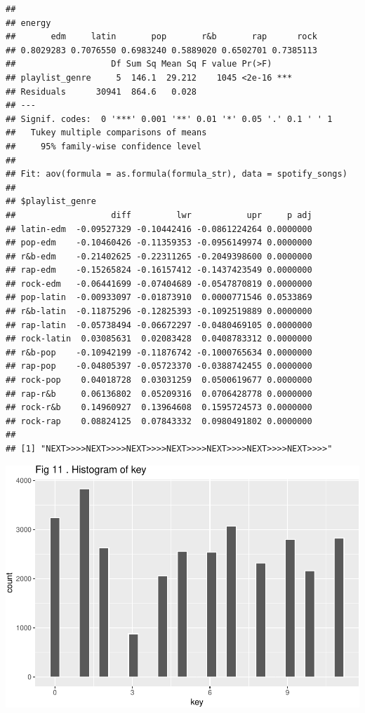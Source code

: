 \documentclass[
]{article}
\begin{document}
\begin{verbatim}
## 
## energy
##       edm     latin       pop       r&b       rap      rock 
## 0.8029283 0.7076550 0.6983240 0.5889020 0.6502701 0.7385113 
##                   Df Sum Sq Mean Sq F value Pr(>F)    
## playlist_genre     5  146.1  29.212    1045 <2e-16 ***
## Residuals      30941  864.6   0.028                   
## ---
## Signif. codes:  0 '***' 0.001 '**' 0.01 '*' 0.05 '.' 0.1 ' ' 1
##   Tukey multiple comparisons of means
##     95% family-wise confidence level
## 
## Fit: aov(formula = as.formula(formula_str), data = spotify_songs)
## 
## $playlist_genre
##                   diff         lwr           upr     p adj
## latin-edm  -0.09527329 -0.10442416 -0.0861224264 0.0000000
## pop-edm    -0.10460426 -0.11359353 -0.0956149974 0.0000000
## r&b-edm    -0.21402625 -0.22311265 -0.2049398600 0.0000000
## rap-edm    -0.15265824 -0.16157412 -0.1437423549 0.0000000
## rock-edm   -0.06441699 -0.07404689 -0.0547870819 0.0000000
## pop-latin  -0.00933097 -0.01873910  0.0000771546 0.0533869
## r&b-latin  -0.11875296 -0.12825393 -0.1092519889 0.0000000
## rap-latin  -0.05738494 -0.06672297 -0.0480469105 0.0000000
## rock-latin  0.03085631  0.02083428  0.0408783312 0.0000000
## r&b-pop    -0.10942199 -0.11876742 -0.1000765634 0.0000000
## rap-pop    -0.04805397 -0.05723370 -0.0388742455 0.0000000
## rock-pop    0.04018728  0.03031259  0.0500619677 0.0000000
## rap-r&b     0.06136802  0.05209316  0.0706428778 0.0000000
## rock-r&b    0.14960927  0.13964608  0.1595724573 0.0000000
## rock-rap    0.08824125  0.07843332  0.0980491802 0.0000000
## 
## [1] "NEXT>>>>NEXT>>>>NEXT>>>>NEXT>>>>NEXT>>>>NEXT>>>>NEXT>>>>"
\end{verbatim}

\includegraphics{Final-Report_files/figure-latex/unnamed-chunk-14-7.pdf}
\end{document}
